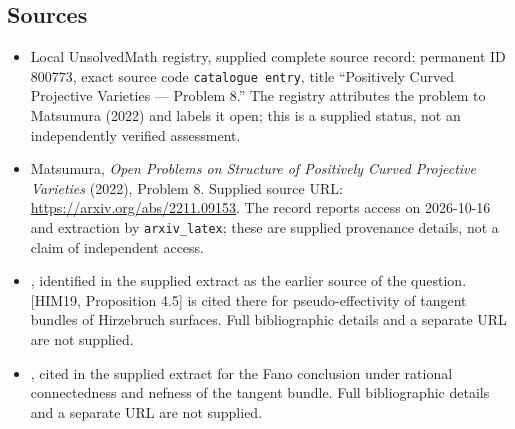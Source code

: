 \documentclass[11pt]{article}
\begin{document}
\subsection{Sources}
\begin{itemize}
\item Local UnsolvedMath registry, supplied complete source record: permanent ID \(800773\), exact source code \texttt{catalogue entry}, title ``Positively Curved Projective Varieties --- Problem 8.'' The registry attributes the problem to Matsumura (2022) and labels it open; this is a supplied status, not an independently verified assessment.
\item Matsumura, \emph{Open Problems on Structure of Positively Curved Projective Varieties} (2022), Problem 8. Supplied source URL: \url{https://arxiv.org/abs/2211.09153}. The record reports access on 2026-10-16 and extraction by \texttt{arxiv\_latex}; these are supplied provenance details, not a claim of independent access.
\item [HIM19, Problem 3.13], identified in the supplied extract as the earlier source of the question. [HIM19, Proposition 4.5] is cited there for pseudo-effectivity of tangent bundles of Hirzebruch surfaces. Full bibliographic details and a separate URL are not supplied.
\item [DPS94], cited in the supplied extract for the Fano conclusion under rational connectedness and nefness of the tangent bundle. Full bibliographic details and a separate URL are not supplied.
\end{itemize}
\end{document}
